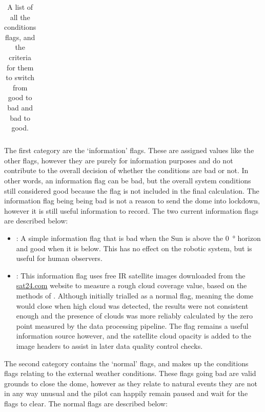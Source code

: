 \begin{colsection}
\begin{colsection}
\begin{table}[p]
\begin{center}
\begin{tabular}{c|cccc}
        \end{tabular}
    \end{center}
    \caption[List of conditions flags and change criteria]{
        A list of all the conditions flags, and the criteria for them to switch from good to bad and bad to good.
        }\label{tab:conditions_flags}
\end{table}

\clearpage

The first category are the `information' flags. These are assigned values like the other flags, however they are purely for information purposes and do not contribute to the overall decision of whether the conditions are bad or not. In other words, an information flag can be bad, but the overall system conditions still considered good because the flag is not included in the final calculation. The information flag being being bad is not a reason to send the dome into lockdown, however it is still useful information to record. The two current information flags are described below:

\begin{itemize}
    \item {}: A simple information flag that is bad when the Sun is above the \SI{0}{\degree} horizon and good when it is below. This has no effect on the robotic system, but is useful for human observers.

    \item {}: This information flag uses free IR satellite images downloaded from the \url{sat24.com} website to measure a rough cloud coverage value, based on the methods of \citet{clouds}. Although initially trialled as a normal flag, meaning the dome would close when high cloud was detected, the results were not consistent enough and the presence of clouds was more reliably calculated by the zero point measured by the data processing pipeline. The flag remains a useful information source however, and the satellite cloud opacity is added to the image headers to assist in later data quality control checks.
\end{itemize}

The second category contains the `normal' flags, and makes up the conditions flags relating to the external weather conditions. These flags going bad are valid grounds to close the dome, however as they relate to natural events they are not in any way unusual and the pilot can happily remain paused and wait for the flags to clear. The normal flags are described below:


\end{colsection}
\end{colsection}
